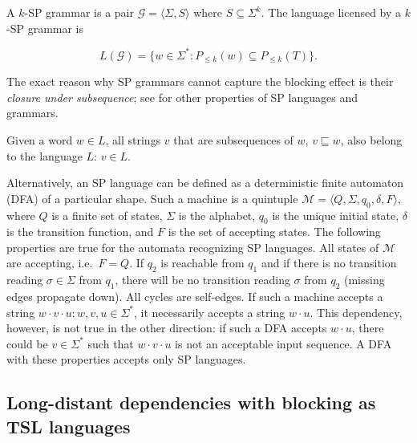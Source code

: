 \begin{definition}
A $k$-SP grammar is a pair $\mathcal{G} = \langle \Sigma, S\rangle$ where $S \subseteq \Sigma^k$. The language licensed by a $k$-SP grammar is

\[
	L(\mathcal{G}) = \{w \in \Sigma^* : P_{\leq k}(w) \subseteq P_{\leq k}(T)\}.
\]
\end{definition}

The exact reason why SP grammars cannot capture the blocking effect is their \emph{closure under subsequence}; see \citep{Rogers-HeinzEtAl-2010-LPTSS} for other properties of SP languages and grammars.

\begin{definition}
Given a word $w \in L$, all strings $v$ that are subsequences of $w$, $v \sqsubseteq w$, also belong to the language $L$: $v \in L$.
\end{definition}


Alternatively, an SP language can be defined as a deterministic finite automaton (DFA) of a particular shape.
Such a machine is a quintuple $\mathcal{M} = \langle Q, \Sigma, q_0, \delta, F\rangle$, where $Q$ is a finite set of states, $\Sigma$ is the alphabet, $q_0$ is the unique initial state, $\delta$ is the transition function, and $F$ is the set of accepting states.
The following properties are true for the automata recognizing SP languages.
All states of $\mathcal{M}$ are accepting, i.e.\ $F = Q$.
If $q_2$ is reachable from $q_1$ and if there is no transition reading $\sigma \in \Sigma$ from $q_1$, there will be no transition reading $\sigma$ from $q_2$ (missing edges propagate down).
All cycles are self-edges.
If such a machine accepts a string $w\cdot v\cdot u : w, v, u \in \Sigma^{*}$, it necessarily accepts a string $w\cdot u$.
This dependency, however, is not true in the other direction: if such a DFA accepts $w\cdot u$, there could be $v \in \Sigma^*$ such that $w\cdot v\cdot u$ is not an acceptable input sequence.
A DFA with these properties accepts only SP languages.







\subsection{Long-distant dependencies with blocking as TSL languages}


